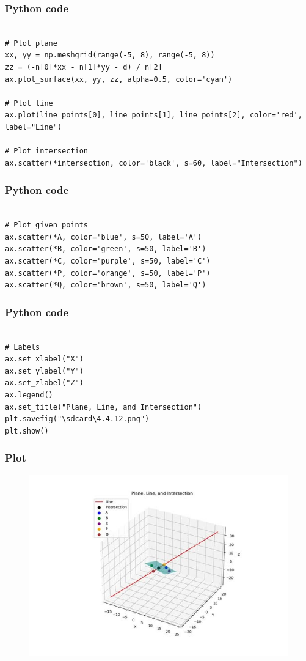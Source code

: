 \documentclass{beamer}
\begin{document}
\begin{frame}[fragile]
    \frametitle{Python code}
    \begin{lstlisting}

# Plot plane
xx, yy = np.meshgrid(range(-5, 8), range(-5, 8))
zz = (-n[0]*xx - n[1]*yy - d) / n[2]
ax.plot_surface(xx, yy, zz, alpha=0.5, color='cyan')

# Plot line
ax.plot(line_points[0], line_points[1], line_points[2], color='red', label="Line")

# Plot intersection
ax.scatter(*intersection, color='black', s=60, label="Intersection")
\end{lstlisting}
 
\end{frame}
\begin{frame}[fragile]
    \frametitle{Python code}
    \begin{lstlisting}

# Plot given points
ax.scatter(*A, color='blue', s=50, label='A')
ax.scatter(*B, color='green', s=50, label='B')
ax.scatter(*C, color='purple', s=50, label='C')
ax.scatter(*P, color='orange', s=50, label='P')
ax.scatter(*Q, color='brown', s=50, label='Q')
\end{lstlisting}
 
\end{frame}
\begin{frame}[fragile]
    \frametitle{Python code}
    \begin{lstlisting}

# Labels
ax.set_xlabel("X")
ax.set_ylabel("Y")
ax.set_zlabel("Z")
ax.legend()
ax.set_title("Plane, Line, and Intersection")
plt.savefig("\sdcard\4.4.12.png")
plt.show()

\end{lstlisting}
 \end{frame}

\begin{frame}[fragile]
    \frametitle{Plot}

\begin{figure}[H]
    \centering
    \includegraphics[scale=0.5]{figs/4.4.12.jpg}
    \caption{}
    \label{fig:1}
\end{figure}


 
\end{frame}
\end{document}
